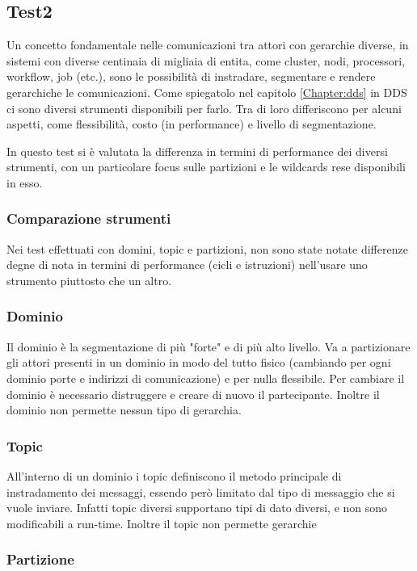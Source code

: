 \subsection{Test2}
Un concetto fondamentale nelle comunicazioni tra attori con gerarchie diverse, in sistemi con diverse centinaia di migliaia di entita, come cluster, nodi, processori, workflow, job (etc.), sono le possibilità di instradare, segmentare e rendere gerarchiche le comunicazioni. Come spiegatolo nel capitolo \ref{Chapter:dds} in DDS ci sono diversi strumenti disponibili per farlo. Tra di loro differiscono per alcuni aspetti, come flessibilità, costo (in performance) e livello di segmentazione.

In questo test si è valutata la differenza in termini di performance dei diversi strumenti, con un particolare focus sulle partizioni e le wildcards rese disponibili in esso.

\subsubsection{Comparazione strumenti}
Nei test effettuati con domini, topic e partizioni, non sono state notate differenze degne di nota in termini di performance (cicli e istruzioni) nell'usare uno strumento piuttosto che un altro. 

\subsubsection*{Dominio} 
Il dominio è la segmentazione di più "forte" e di più alto livello. Va a partizionare gli attori presenti in un dominio in modo del tutto fisico (cambiando per ogni dominio porte e indirizzi di comunicazione) e per nulla flessibile. Per cambiare il dominio è necessario distruggere e creare di nuovo il partecipante. Inoltre il dominio non permette nessun tipo di gerarchia.
    
\subsubsection*{Topic}
All'interno di un dominio i topic definiscono il metodo principale di instradamento dei messaggi, essendo però limitato dal tipo di messaggio che si vuole inviare. Infatti topic diversi supportano tipi di dato diversi, e non sono modificabili a run-time. %
Inoltre il topic non permette gerarchie

\subsubsection*{Partizione}


